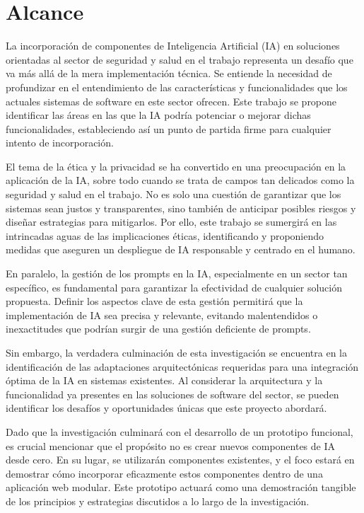 \section{Alcance}
La incorporación de componentes de Inteligencia Artificial (IA) en soluciones orientadas al sector de seguridad y salud en el trabajo representa un desafío que va más allá de la mera implementación técnica. Se entiende la necesidad de profundizar en el entendimiento de las características y funcionalidades que los actuales sistemas de software en este sector ofrecen. Este trabajo se propone identificar las áreas en las que la IA podría potenciar o mejorar dichas funcionalidades, estableciendo así un punto de partida firme para cualquier intento de incorporación.

El tema de la ética y la privacidad se ha convertido en una preocupación en la aplicación de la IA, sobre todo cuando se trata de campos tan delicados como la seguridad y salud en el trabajo. No es solo una cuestión de garantizar que los sistemas sean justos y transparentes, sino también de anticipar posibles riesgos y diseñar estrategias para mitigarlos. Por ello, este trabajo se sumergirá en las intrincadas aguas de las implicaciones éticas, identificando y proponiendo medidas que aseguren un despliegue de IA responsable y centrado en el humano.

En paralelo, la gestión de los prompts en la IA, especialmente en un sector tan específico, es fundamental para garantizar la efectividad de cualquier solución propuesta. Definir los aspectos clave de esta gestión permitirá que la implementación de IA sea precisa y relevante, evitando malentendidos o inexactitudes que podrían surgir de una gestión deficiente de prompts.

Sin embargo, la verdadera culminación de esta investigación se encuentra en la identificación de las adaptaciones arquitectónicas requeridas para una integración óptima de la IA en sistemas existentes. Al considerar la arquitectura y la funcionalidad ya presentes en las soluciones de software del sector, se pueden identificar los desafíos y oportunidades únicas que este proyecto abordará.

Dado que la investigación culminará con el desarrollo de un prototipo funcional, es crucial mencionar que el propósito no es crear nuevos componentes de IA desde cero. En su lugar, se utilizarán componentes existentes, y el foco estará en demostrar cómo incorporar eficazmente estos componentes dentro de una aplicación web modular. Este prototipo actuará como una demostración tangible de los principios y estrategias discutidos a lo largo de la investigación.

